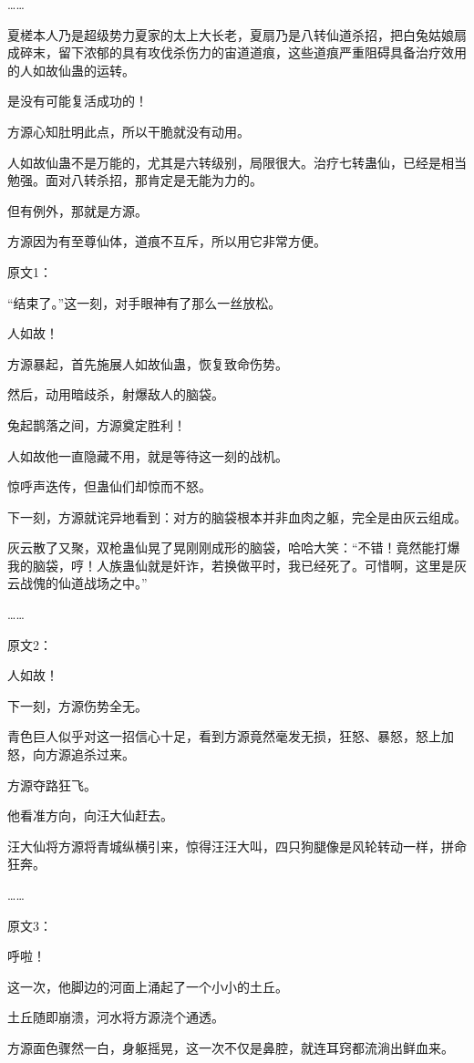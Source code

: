 \begin{this_body}
……

夏槎本人乃是超级势力夏家的太上大长老，夏扇乃是八转仙道杀招，把白兔姑娘扇成碎末，留下浓郁的具有攻伐杀伤力的宙道道痕，这些道痕严重阻碍具备治疗效用的人如故仙蛊的运转。

是没有可能复活成功的！

方源心知肚明此点，所以干脆就没有动用。

人如故仙蛊不是万能的，尤其是六转级别，局限很大。治疗七转蛊仙，已经是相当勉强。面对八转杀招，那肯定是无能为力的。

但有例外，那就是方源。

方源因为有至尊仙体，道痕不互斥，所以用它非常方便。

原文1：

“结束了。”这一刻，对手眼神有了那么一丝放松。

人如故！

方源暴起，首先施展人如故仙蛊，恢复致命伤势。

然后，动用暗歧杀，射爆敌人的脑袋。

兔起鹊落之间，方源奠定胜利！

人如故他一直隐藏不用，就是等待这一刻的战机。

惊呼声迭传，但蛊仙们却惊而不怒。

下一刻，方源就诧异地看到：对方的脑袋根本并非血肉之躯，完全是由灰云组成。

灰云散了又聚，双枪蛊仙晃了晃刚刚成形的脑袋，哈哈大笑：“不错！竟然能打爆我的脑袋，哼！人族蛊仙就是奸诈，若换做平时，我已经死了。可惜啊，这里是灰云战傀的仙道战场之中。”

……

原文2：

人如故！

下一刻，方源伤势全无。

青色巨人似乎对这一招信心十足，看到方源竟然毫发无损，狂怒、暴怒，怒上加怒，向方源追杀过来。

方源夺路狂飞。

他看准方向，向汪大仙赶去。

汪大仙将方源将青城纵横引来，惊得汪汪大叫，四只狗腿像是风轮转动一样，拼命狂奔。

……

原文3：

呼啦！

这一次，他脚边的河面上涌起了一个小小的土丘。

土丘随即崩溃，河水将方源浇个通透。

方源面色骤然一白，身躯摇晃，这一次不仅是鼻腔，就连耳窍都流淌出鲜血来。


\end{this_body}
